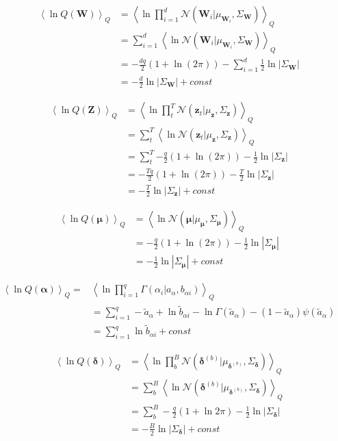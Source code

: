 \documentclass[10pt]{article}
\newcommand{\Angle}[1]{\left \langle #1 \right \rangle}
\newcommand{\Eq}[1]{\Angle{#1}_Q}
\newcommand{\N}[2][]{\mathcal{N} \left( #1,#2 \right)}
\newcommand{\Det}[1]{\left| #1 \right|}
\begin{document}
    \begin{align}
        \Eq{\ln{Q(\bm{W})}}&=\Eq{\ln{\prod_{i=1}^d{\N[\bm{W}_i | \mu_{\bm{W}_i}]{\Sigma_{\bm{W}}}}}} \nonumber\\
        &=\sum_{i=1}^d{\Eq{\ln{\N[{\bm{W}_i} | \mu_{\bm{W}_i}]{\Sigma_{\bm{W}}}}}} \nonumber \\
        &=-\frac{dq}{2}(1+\ln(2\pi)) - \sum_{i=1}^d{\frac{1}{2}\ln{\Det{\Sigma_{\bm{W}}}}}  \nonumber \\
        &=-\frac{d}{2}\ln{\Det{\Sigma_{\bm{W}}}} + const
        \label{qw}
    \end{align}

    \begin{align}
        \Eq{\ln{Q(\bm{Z})}}&=\Eq{\ln{\prod_t^T{\N[\bm{z}_t| \mu_{\bm{z}}]{\Sigma_{\bm{z}}}}}} \nonumber \\
        &=\sum_t^T{\Eq{\ln{\N[\bm{z}_t \vert \mu_{\bm{z}}]{\Sigma_{\bm{z}}}}}} \nonumber \\
        &=\sum_t^T{-\frac{q}{2}(1+\ln(2\pi)) - \frac{1}{2}\ln{\Det{\Sigma_{\bm{z}}}}} \nonumber \\
        &=-\frac{Tq}{2}( 1+\ln(2\pi)) - \frac{T}{2}\ln{\Det{\Sigma_{\bm{z}}}} \nonumber \\
        &=-\frac{T}{2}\ln{\Det{\Sigma_{\bm{z}}}} + const
        \label{qz}
    \end{align}

    \begin{align}
        \Eq{\ln{Q(\bm{\mu})}}&=\Eq{\ln{\N[\bm{\mu} | \mu_{\bm{\mu}}]{\Sigma_{\bm{\mu}}}}} \nonumber \\
        &=-\frac{q}{2}( 1+\ln(2\pi)) - \frac{1}{2}\ln{\Det{\Sigma_{\bm{\mu}}}} \nonumber \\
        &=-\frac{1}{2}\ln{\Det{\Sigma_{\bm{\mu}}}} + const
        \label{qmu}
    \end{align}

    \begin{align}
        \Eq{\ln{Q(\bm{\alpha})}}=&\Eq{\ln{\prod_{i=1}^q \Gamma(\alpha_i \vert a_\alpha,b_{\alpha i})}} \\
        &=\sum_{i=1}^q -\tilde{a}_\alpha+\ln{\tilde{b}_{\alpha i}}-\ln{\Gamma(\tilde{a}_\alpha)}-(1-\tilde{a}_\alpha)\psi(\tilde{a}_\alpha) \\
        &=\sum_{i=1}^q \ln{\tilde{b}_{\alpha i}} + const
        \label{qalpha}
    \end{align}

    \begin{align}
        \Eq{\ln{Q(\bm{\delta})}}&= \Eq{\ln{\prod_b^B\mathcal{N}(\bm{\delta}^{(b)}|\mu_{\bm{\delta}^{(b)}}, \Sigma_{\bm{\delta}})}} \nonumber \\
        &=\sum_b^B\Eq{\ln{\mathcal{N}(\bm{\delta}^{(b)}|\mu_{\bm{\delta}^{(b)}},\Sigma_{\bm{\delta}})}} \nonumber \\
        &= \sum_b^B-\frac{q}{2}(1 + \ln{2\pi}) - \frac{1}{2}\ln{|\Sigma_{\bm{\delta}}|}\nonumber \\
        &= -\frac{B}{2}\ln{|\Sigma_{\bm{\delta}}|} + const
        \label{qdelta}
    \end{align}
\end{document}
